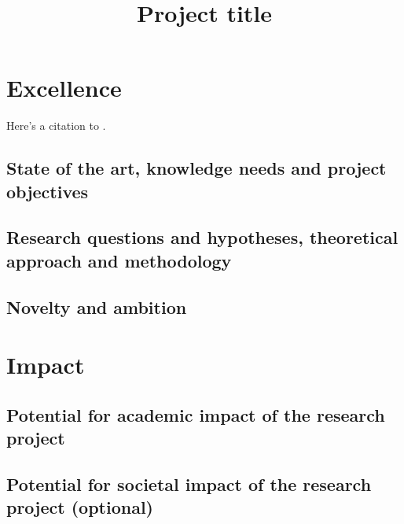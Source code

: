 \documentclass{nfr}
\title{Project title}
\begin{document}

% 
% 
% 
% 


\maketitle

\section{Excellence}

Here's a citation to \cite{texbook}.

\subsection{State of the art, knowledge needs and project objectives}

\subsection{Research questions and hypotheses, theoretical approach and methodology}

\subsection{Novelty and ambition}

\section{Impact}

\subsection{Potential for academic impact of the research project}

\subsection{Potential for societal impact of the research project (optional)}
\end{document}
